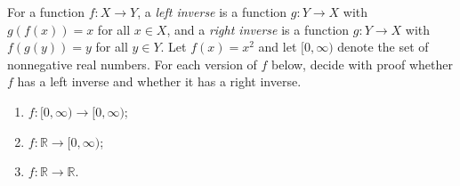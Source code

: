 For a function $f:X\to Y$, a \emph{left inverse} is a function $g:Y\to X$ with $g(f(x))=x$ for all $x\in X$, and a \emph{right inverse} is a function $g:Y\to X$ with $f(g(y))=y$ for all $y\in Y$. Let $f(x)=x^2$ and let $[0,\infty)$ denote the set of nonnegative real numbers. For each version of $f$ below, decide with proof whether $f$ has a left inverse and whether it has a right inverse.
\begin{enumerate}
\item[(a)] $f:[0,\infty)\to[0,\infty)$;
\item[(b)] $f:\mathbb R\to[0,\infty)$;
\item[(c)] $f:\mathbb R\to\mathbb R$.
\end{enumerate}
